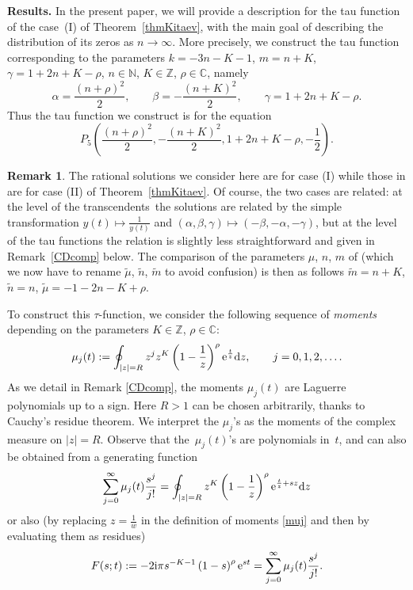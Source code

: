 \documentclass[pdftex]{sigma}
\numberwithin{equation}{section}
\theoremstyle{definition}
\newtheorem{Remark}[Theorem]{Remark}
\def\le{\left}
\def\ri{\right}
\def \wt{ \widetilde }
\def \d{{\mathrm d}}
\def\be{\begin{equation}}
\def\ee{\end{equation}}
\def\C{{\mathbb C}}
\def\Z{{\mathbb Z}}
\def\N{{\mathbb N}}
\begin{document}
{\bf Results.}
In the present paper, we will provide a description for the tau function of the case~(I) of Theorem~\ref{thmKitaev}, with the main goal of describing the distribution of its zeros as $n\to \infty$.
More precisely, we construct the tau function corresponding to the parameters
$k = -3n - {K} -1$, $ m = n+ {K}$, $ \gamma = 1+2n + {K} -{\rho}$, $ n\in \N$, $ {K} \in \Z$, $ {\rho} \in \C$,
namely
\[%
\alpha = \frac {(n+ { {\rho}})^2}2,\qquad
\beta = -\frac {(n + { {K}})^2} 2,\qquad
\gamma = 1+2n + { {K}} - { {\rho}}.
\]
Thus the tau function we construct is for the equation
\[
P_5\le( \frac {(n+ { {\rho}})^2}2, -\frac {(n + { {K}})^2} 2, 1+2n + { {K}} - { {\rho}}, - \frac 1 2\ri).
\]
\begin{Remark}
The rational solutions we consider here are for case (I) while those in \cite{ClarksonDunning} are for case (II) of Theorem~\ref{thmKitaev}. Of course, the two cases are related: at the level of the transcendents~the solutions are related by the simple transformation $y(t)\mapsto \frac 1{y(t)}$ and $(\alpha,\beta, \gamma)\mapsto (-\beta,-\alpha,-\gamma)$, but at the level of the tau functions the relation is slightly less straightforward and given in Remark~\ref{CDcomp} below.
The comparison of the parameters $\mu$, $n$, $m$ of \cite{ClarksonDunning} (which we now have to rename $\wt \mu$, $\wt n$, $\wt m$ to avoid confusion) is then as follows
$
\wt m= n+ { {K}} $, $ \wt n= n$, $
\wt \mu =- 1-2n- { {K}}+ { {\rho}}$.
\end{Remark}
To construct this $\tau$-function, we consider the following sequence of {\it moments} depending on the parameters ${K} \in \Z$, ${\rho} \in \C$:
\be
\label{muj}
\mu_j(t):= \oint_{|z|=R}z^j z^{ {K}} \le(1 - \frac 1 z \ri)^{{\rho}} {\rm e}^{\frac t z}\d z, \qquad j=0,1,2,\dots.
\ee
As we detail in Remark \ref{CDcomp}, the moments $\mu_j(t)$ are Laguerre polynomials up to a sign.
Here $R>1$ can be chosen arbitrarily, thanks to Cauchy's residue theorem.
We interpret the $\mu_j$'s as the moments of the complex measure \smash{$\d\mu(z) = z^{ {K}} \le(1 - \frac 1 z \ri)^{{\rho}} {\rm e}^{\frac t z}\d z$} on $|z|=R$. Observe that the~$\mu_j(t)$'s are polynomials in~$t$, and can also be obtained from a generating function
\[
\sum_{j=0}^\infty \mu_j(t) \frac{s^j}{j!} = \oint_{|z|=R} z^{ {K}} \le(1 - \frac 1 z \ri)^{{\rho}} {\rm e}^{\frac t z + sz}\d z
\]
 or also (by replacing $z= \frac 1 w$ in the definition of moments \eqref{muj} and then by evaluating them as residues)
 \[
 F(s;t):=-2{\rm i}\pi s^{-{K}-1} \le(1-s\ri)^{{\rho}} {\rm e}^{st} = \sum_{j=0}^{\infty} \mu_j(t) \frac { s^j}{j!}.
 \]
\end{document}
